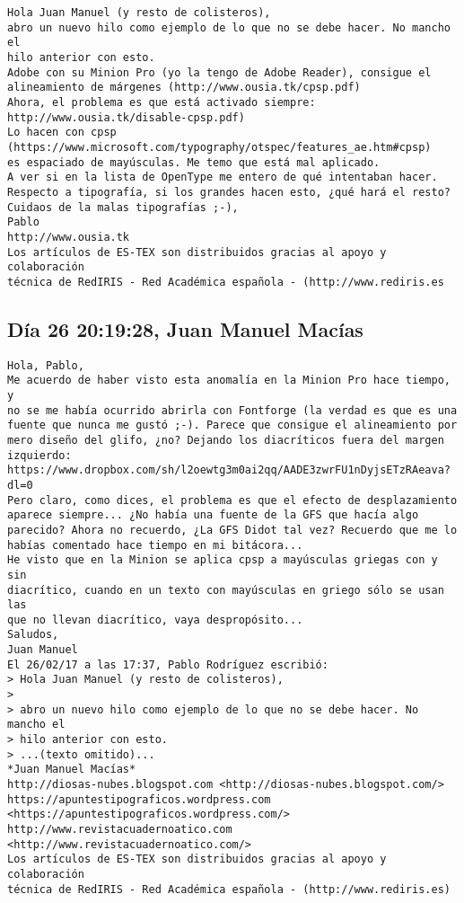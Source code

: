 \documentclass[a4paper,10pt]{article}
\begin{document}
\begin{lstlisting}
Hola Juan Manuel (y resto de colisteros),
abro un nuevo hilo como ejemplo de lo que no se debe hacer. No mancho el
hilo anterior con esto.
Adobe con su Minion Pro (yo la tengo de Adobe Reader), consigue el
alineamiento de márgenes (http://www.ousia.tk/cpsp.pdf)
Ahora, el problema es que está activado siempre:
http://www.ousia.tk/disable-cpsp.pdf)
Lo hacen con cpsp
(https://www.microsoft.com/typography/otspec/features_ae.htm#cpsp)
es espaciado de mayúsculas. Me temo que está mal aplicado.
A ver si en la lista de OpenType me entero de qué intentaban hacer.
Respecto a tipografía, si los grandes hacen esto, ¿qué hará el resto?
Cuidaos de la malas tipografías ;-),
Pablo
http://www.ousia.tk
Los artículos de ES-TEX son distribuidos gracias al apoyo y colaboración 
técnica de RedIRIS - Red Académica española - (http://www.rediris.es

\end{lstlisting}

\subsection{Día 26 20:19:28, Juan Manuel Macías}

\begin{lstlisting}
Hola, Pablo,
Me acuerdo de haber visto esta anomalía en la Minion Pro hace tiempo, y 
no se me había ocurrido abrirla con Fontforge (la verdad es que es una 
fuente que nunca me gustó ;-). Parece que consigue el alineamiento por 
mero diseño del glifo, ¿no? Dejando los diacríticos fuera del margen 
izquierdo:
https://www.dropbox.com/sh/l2oewtg3m0ai2qq/AADE3zwrFU1nDyjsETzRAeava?dl=0
Pero claro, como dices, el problema es que el efecto de desplazamiento 
aparece siempre... ¿No había una fuente de la GFS que hacía algo 
parecido? Ahora no recuerdo, ¿La GFS Didot tal vez? Recuerdo que me lo 
habías comentado hace tiempo en mi bitácora...
He visto que en la Minion se aplica cpsp a mayúsculas griegas con y sin 
diacrítico, cuando en un texto con mayúsculas en griego sólo se usan las 
que no llevan diacrítico, vaya despropósito...
Saludos,
Juan Manuel
El 26/02/17 a las 17:37, Pablo Rodríguez escribió:
> Hola Juan Manuel (y resto de colisteros),
>
> abro un nuevo hilo como ejemplo de lo que no se debe hacer. No mancho el
> hilo anterior con esto.
> ...(texto omitido)...
*Juan Manuel Macías*
http://diosas-nubes.blogspot.com <http://diosas-nubes.blogspot.com/>
https://apuntestipograficos.wordpress.com 
<https://apuntestipograficos.wordpress.com/>
http://www.revistacuadernoatico.com <http://www.revistacuadernoatico.com/>
Los artículos de ES-TEX son distribuidos gracias al apoyo y colaboración 
técnica de RedIRIS - Red Académica española - (http://www.rediris.es)

\end{lstlisting}
\end{document}
